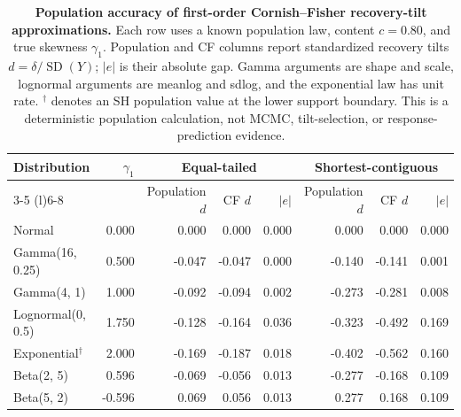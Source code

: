 \begin{table}[H]
\centering
\caption{\textbf{Population accuracy of first-order Cornish--Fisher recovery-tilt approximations.} Each row uses a known population law, content $c=0.80$, and true skewness $\gamma_1$. Population and CF columns report standardized recovery tilts $d=\delta/\operatorname{SD}(Y)$; $|e|$ is their absolute gap. Gamma arguments are shape and scale, lognormal arguments are meanlog and sdlog, and the exponential law has unit rate. $^{\dagger}$ denotes an SH population value at the lower support boundary. This is a deterministic population calculation, not MCMC, tilt-selection, or response-prediction evidence.}
\label{tab:mean-tilt-cf-mini-study}
\TableStyle
\begin{tabular}{@{}l@{\hspace{0.8em}}rrrrrrr@{}}
\toprule
Distribution & $\gamma_1$ & \multicolumn{3}{c}{Equal-tailed} & \multicolumn{3}{c}{Shortest-contiguous} \\
\cmidrule(lr){3-5} \cmidrule(l){6-8}
& & Population $d$ & CF $d$ & $|e|$ & Population $d$ & CF $d$ & $|e|$ \\
\midrule
Normal & 0.000 & 0.000 & 0.000 & 0.000 & 0.000 & 0.000 & 0.000 \\
Gamma(16, 0.25) & 0.500 & -0.047 & -0.047 & 0.000 & -0.140 & -0.141 & 0.001 \\
Gamma(4, 1) & 1.000 & -0.092 & -0.094 & 0.002 & -0.273 & -0.281 & 0.008 \\
Lognormal(0, 0.5) & 1.750 & -0.128 & -0.164 & 0.036 & -0.323 & -0.492 & 0.169 \\
Exponential$^{\dagger}$ & 2.000 & -0.169 & -0.187 & 0.018 & -0.402 & -0.562 & 0.160 \\
Beta(2, 5) & 0.596 & -0.069 & -0.056 & 0.013 & -0.277 & -0.168 & 0.109 \\
Beta(5, 2) & -0.596 & 0.069 & 0.056 & 0.013 & 0.277 & 0.168 & 0.109 \\
\bottomrule
\end{tabular}
\end{table}
